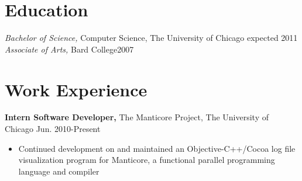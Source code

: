 \documentclass[line,overlapped]{res}
\begin{document}
 
 
 
\address{jordanthelewis@gmail.com \hspace{1.63in} Current: 5709 S. Kimbark Ave. Apt. 3, Chicago, IL 60637}
\address{(917) 974-7144 \hspace{2.81in} Permanent: 6 Warren Place, Brooklyn, NY 11201}

 
\newsectionwidth{.2in}
\begin{resume} 
 
\section{Education} 
{\sl Bachelor of Science,} Computer Science, The University of Chicago \hfill expected 2011\\
{\sl Associate of Arts,} Bard College\hfill 2007

\section{Work Experience}
{\bf Intern Software Developer,} The Manticore Project, The University of Chicago \hfill Jun. 2010-Present
\begin{itemize} \itemsep -2pt
    \item Continued development on and maintained an Objective-C++/Cocoa log file visualization program for Manticore, a functional parallel programming language and compiler
\end{itemize}

\vspace{-10pt}


\end{resume}
\end{document}
